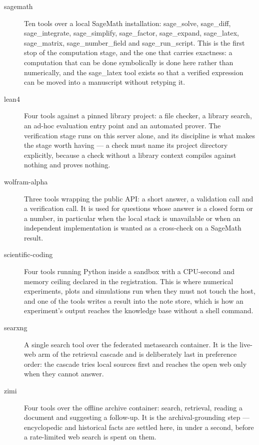 \documentclass[10pt]{article}
\newcommand{\mono}[1]{{\ttfamily\small #1}}
\begin{document}
\begin{description}

\item[\mono{sagemath}] Ten tools over a local SageMath installation: \mono{sage\_solve},
\mono{sage\_diff}, \mono{sage\_integrate}, \mono{sage\_simplify}, \mono{sage\_factor},
\mono{sage\_expand}, \mono{sage\_latex}, \mono{sage\_matrix}, \mono{sage\_number\_field} and
\mono{sage\_run\_script}. This is the first stop of the computation stage, and the one that carries
exactness: a computation that can be done symbolically is done here rather than numerically, and the
\mono{sage\_latex} tool exists so that a verified expression can be moved into a manuscript without
retyping it.

\item[\mono{lean4}] Four tools against a pinned library project: a file checker, a library search, an
ad-hoc evaluation entry point and an automated prover. The verification stage runs on this server
alone, and its discipline is what makes the stage worth having --- a check must name its project
directory explicitly, because a check without a library context compiles against nothing and proves
nothing.

\item[\mono{wolfram-alpha}] Three tools wrapping the public API: a short answer, a validation call
and a verification call. It is used for questions whose answer is a closed form or a number, in
particular when the local stack is unavailable or when an independent implementation is wanted as a
cross-check on a SageMath result.

\item[\mono{scientific-coding}] Four tools running Python inside a sandbox with a CPU-second and
memory ceiling declared in the registration. This is where numerical experiments, plots and
simulations run when they must not touch the host, and one of the tools writes a result into the note
store, which is how an experiment's output reaches the knowledge base without a shell command.

\item[\mono{searxng}] A single search tool over the federated metasearch container. It is the
live-web arm of the retrieval cascade and is deliberately last in preference order: the cascade tries
local sources first and reaches the open web only when they cannot answer.

\item[\mono{zimi}] Four tools over the offline archive container: search, retrieval, reading a
document and suggesting a follow-up. It is the archival-grounding step --- encyclopedic and
historical facts are settled here, in under a second, before a rate-limited web search is spent on
them.


\end{description}
\end{document}
